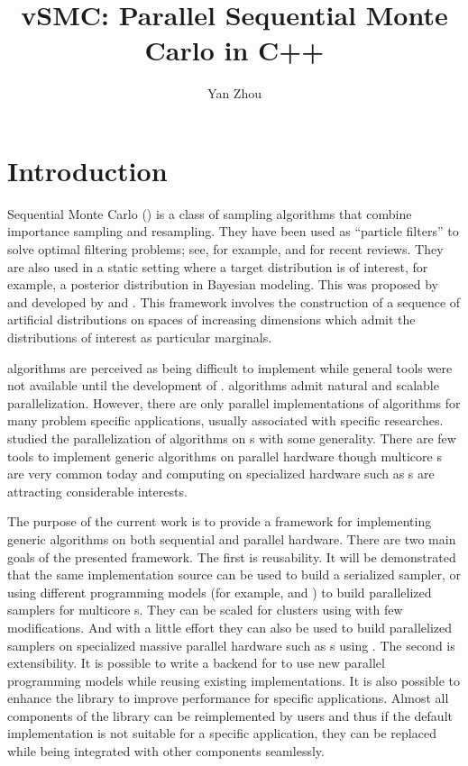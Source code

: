 \documentclass[11pt, fontset=Minion, showoverfull,
bib, biblatexstyle=numeric, mintcode, minted=cache]{marticle}
\title{vSMC: Parallel Sequential Monte Carlo in C++}
\author{Yan Zhou}
\begin{document}
\maketitle

\section{Introduction}
\label{sec:Introduction}

Sequential Monte Carlo (\smc) is a class of sampling algorithms that combine
importance sampling and resampling. They have been used as ``particle
filters'' to solve optimal filtering problems; see, for example,
\cite{Cappe:2007hz} and \cite{Doucet:2011us} for recent reviews. They are also
used in a static setting where a target distribution is of interest, for
example, a posterior distribution in Bayesian modeling. This was proposed by
\cite{DelMoral:2006hc} and developed by \cite{Peters:2005wh} and
\cite{DelMoral:2006wv}. This framework involves the construction of a sequence
of artificial distributions on spaces of increasing dimensions which admit the
distributions of interest as particular marginals.

\smc algorithms are perceived as being difficult to implement while general
tools were not available until the development of \csmctc. \smc algorithms
admit natural and scalable parallelization. However, there are only parallel
implementations of \smc algorithms for many problem specific applications,
usually associated with specific researches. \cite{Lee:2010fm} studied the
parallelization of \smc algorithms on \gpu{}s with some generality. There are
few tools to implement generic \smc algorithms on parallel hardware though
multicore \cpu{}s are very common today and computing on specialized hardware
such as \gpu{}s are attracting considerable interests.

The purpose of the current work is to provide a framework for implementing
generic \smc algorithms on both sequential and parallel hardware. There are
two main goals of the presented framework. The first is reusability. It will
be demonstrated that the same implementation source can be used to build a
serialized sampler, or using different programming models (for example,
\copenmp and \ctbb) to build parallelized samplers for multicore \cpu{}s. They
can be scaled for clusters using \cmpi with few modifications. And with a
little effort they can also be used to build parallelized samplers on
specialized massive parallel hardware such as \gpu{}s using \copencl. The
second is extensibility. It is possible to write a backend for \vsmc to use
new parallel programming models while reusing existing implementations. It is
also possible to enhance the library to improve performance for specific
applications. Almost all components of the library can be reimplemented by
users and thus if the default implementation is not suitable for a specific
application, they can be replaced while being integrated with other components
seamlessly.
\end{document}
